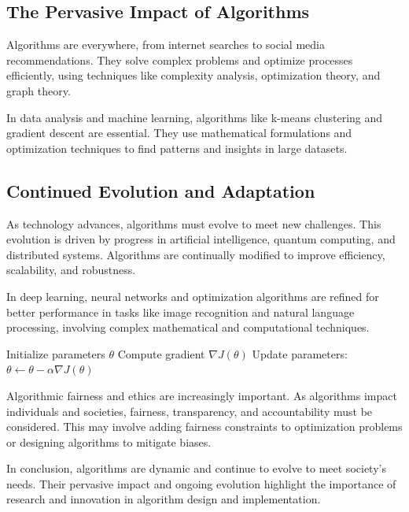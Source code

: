 \documentclass[12pt]{book} %
\begin{document}
\subsection{The Pervasive Impact of Algorithms}
Algorithms are everywhere, from internet searches to social media recommendations. They solve complex problems and optimize processes efficiently, using techniques like complexity analysis, optimization theory, and graph theory.

In data analysis and machine learning, algorithms like k-means clustering and gradient descent are essential. They use mathematical formulations and optimization techniques to find patterns and insights in large datasets.

\subsection{Continued Evolution and Adaptation}
As technology advances, algorithms must evolve to meet new challenges. This evolution is driven by progress in artificial intelligence, quantum computing, and distributed systems. Algorithms are continually modified to improve efficiency, scalability, and robustness.

In deep learning, neural networks and optimization algorithms are refined for better performance in tasks like image recognition and natural language processing, involving complex mathematical and computational techniques.


\FloatBarrier
\begin{algorithm}
\caption{Gradient Descent Algorithm}
\begin{algorithmic}[1]
\State Initialize parameters $\theta$
\Repeat
\State Compute gradient $\nabla J(\theta)$
\State Update parameters: $\theta \leftarrow \theta - \alpha \nabla J(\theta)$
\end{algorithmic}
\end{algorithm}
\FloatBarrier

Algorithmic fairness and ethics are increasingly important. As algorithms impact individuals and societies, fairness, transparency, and accountability must be considered. This may involve adding fairness constraints to optimization problems or designing algorithms to mitigate biases.

In conclusion, algorithms are dynamic and continue to evolve to meet society's needs. Their pervasive impact and ongoing evolution highlight the importance of research and innovation in algorithm design and implementation.
\end{document}
